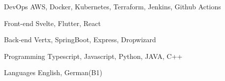 

\begin{cvskills}

  \cvskill
    {DevOps} %
    {AWS, Docker, Kubernetes, Terraform, Jenkins, Github Actions} %

  \cvskill
    {Front-end} %
    {Svelte, Flutter, React} %

  \cvskill
    {Back-end} %
    {Vertx, SpringBoot, Express, Dropwizard} %

  \cvskill
    {Programming} %
    {Typescript, Javascript, Python, JAVA, C++} %

  \cvskill
    {Languages} %
    {English, German(B1)} %

\end{cvskills}

